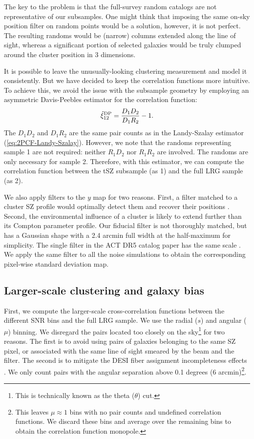 The key to the problem is that the full-survey random catalogs are not representative of our subsamples.
One might think that imposing the same on-sky position filter on random points would be a solution, however, it is not perfect.
The resulting randoms would be (narrow) columns extended along the line of sight, whereas a significant portion of selected galaxies would be truly clumped around the cluster position in 3 dimensions.

It is possible to leave the unusually-looking clustering measurement and model it consistently.
But we have decided to keep the correlation functions more intuitive.
To achieve this, we avoid the issue with the subsample geometry by employing an asymmetric Davis-Peebles estimator \citep{Davis-Peebles} for the correlation function:
\begin{equation} \label{eq:2PCF-Davis-Peebles}
    \hat \xi^{\rm DP}_{12} = \frac{D_1 D_2}{D_1 R_2} - 1.
\end{equation}
The $D_1 D_2$ and $D_1 R_2$ are the same pair counts as in the Landy-Szalay estimator (\cref{eq:2PCF-Landy-Szalay}).
However, we note that the randoms representing sample 1 are not required: neither $R_1 D_2$ nor $R_1 R_2$ are involved.
The randoms are only necessary for sample 2.
Therefore, with this estimator, we can compute the correlation function between the tSZ subsample (as 1) and the full LRG sample (as 2).

We also apply filters to the $y$ map for two reasons.
First, a filter matched to a cluster SZ profile would optimally detect them and recover their positions \citep{matched-filters-intro}.
Second, the environmental influence of a cluster is likely to extend further than its Compton parameter profile.
Our fiducial filter is not thoroughly matched, but has a Gaussian shape with a 2.4 arcmin full width at the half-maximum for simplicity.
The single filter in the ACT DR5 catalog paper has the same scale \citep{ACT-SZ-clusters-DR5}.
We apply the same filter to all the noise simulations to obtain the corresponding pixel-wise standard deviation map.

\subsection{Larger-scale clustering and galaxy bias}
\label{sec:DESI-tSZ:measurements:large}

First, we compute the larger-scale cross-correlation functions between the different SNR bins and the full LRG sample.
We use the radial ($s$) and angular ($\mu$) binning.
We disregard the pairs located too closely on the sky\footnote{This is technically known as the theta ($\theta$) cut.} for two reasons.
The first is to avoid using pairs of galaxies belonging to the same SZ pixel, or associated with the same line of sight smeared by the beam and the filter.
The second is to mitigate the DESI fiber assignment incompleteness effects \citep{KP3s5-Pinon}.
We only count pairs with the angular separation above 0.1 degrees (6 arcmin)\footnote{This leaves $\mu\approx 1$ bins with no pair counts and undefined correlation functions. We discard these bins and average over the remaining bins to obtain the correlation function monopole.}.

